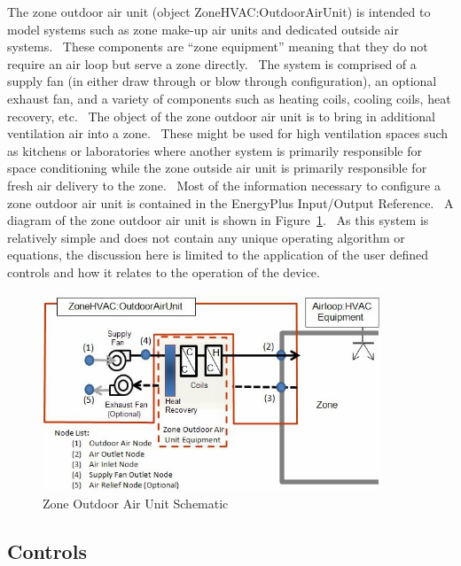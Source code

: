 The zone outdoor air unit (object ZoneHVAC:OutdoorAirUnit) is intended to model systems such as zone make-up air units and dedicated outside air systems.~ These components are ``zone equipment'' meaning that they do not require an air loop but serve a zone directly.~ The system is comprised of a supply fan (in either draw through or blow through configuration), an optional exhaust fan, and a variety of components such as heating coils, cooling coils, heat recovery, etc.~ The object of the zone outdoor air unit is to bring in additional ventilation air into a zone.~ These might be used for high ventilation spaces such as kitchens or laboratories where another system is primarily responsible for space conditioning while the zone outside air unit is primarily responsible for fresh air delivery to the zone.~ Most of the information necessary to configure a zone outdoor air unit is contained in the EnergyPlus Input/Output Reference.~ A diagram of the zone outdoor air unit is shown in Figure~\ref{fig:zone-outdoor-air-unit-schematic}.~ As this system is relatively simple and does not contain any unique operating algorithm or equations, the discussion here is limited to the application of the user defined controls and how it relates to the operation of the device.

\begin{figure}[hbtp] %
\centering
\includegraphics[width=0.9\textwidth, height=0.9\textheight, keepaspectratio=true]{media/image7466.png}
\caption{Zone Outdoor Air Unit Schematic \protect \label{fig:zone-outdoor-air-unit-schematic}}
\end{figure}

\subsection{Controls}\label{controls-2-000}

